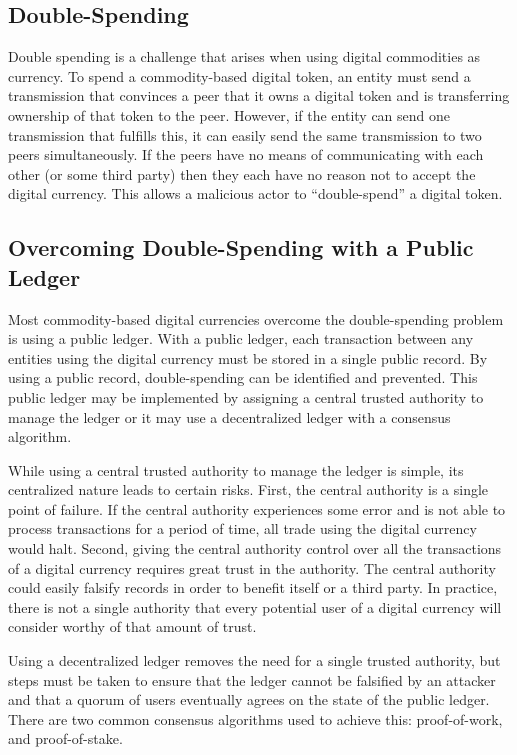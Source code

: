\documentclass[runningheads]{llncs}
\begin{document}
\subsection{Double-Spending}
Double spending is a challenge that arises when using digital commodities as currency. To spend a commodity-based digital token, an entity must send a transmission that convinces a peer that it owns a digital token and is transferring ownership of that token to the peer. However, if the entity can send one transmission that fulfills this, it can easily send the same transmission to two peers simultaneously. If the peers have no means of communicating with each other (or some third party) then they each have no reason not to accept the digital currency. This allows a malicious actor to “double-spend” a digital token.

\subsection{Overcoming Double-Spending with a Public Ledger}
Most commodity-based digital currencies overcome the double-spending problem is using a public ledger. With a public ledger, each transaction between any entities using the digital currency must be stored in a single public record. By using a public record, double-spending can be identified and prevented. This public ledger may be implemented by assigning a central trusted authority to manage the ledger or it may use a decentralized ledger with a consensus algorithm. 

While using a central trusted authority to manage the ledger is simple, its centralized nature leads to certain risks. First, the central authority is a single point of failure. If the central authority experiences some error and is not able to process transactions for a period of time, all trade using the digital currency would halt. Second, giving the central authority control over all the transactions of a digital currency requires great trust in the authority. The central authority could easily falsify records in order to benefit itself or a third party. In practice, there is not a single authority that every potential user of a digital currency will consider worthy of that amount of trust.

Using a decentralized ledger removes the need for a single trusted authority, but steps must be taken to ensure that the ledger cannot be falsified by an attacker and that a quorum of users eventually agrees on the state of the public ledger. There are two common consensus algorithms used to achieve this: proof-of-work, and proof-of-stake.
\end{document}
